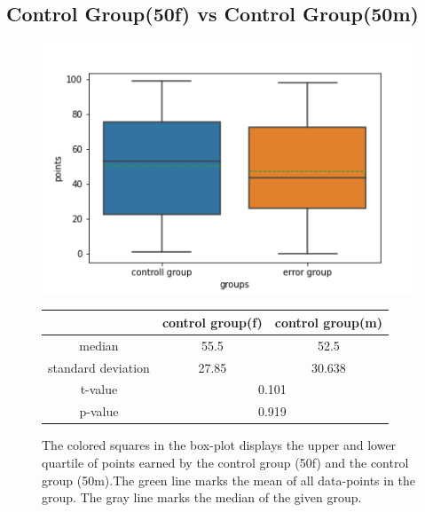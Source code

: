 \documentclass[runningheads]{llncs}
\begin{document}
\subsection{Control Group(50f) vs Control Group(50m)}
\begin{figure}
    \begin{minipage}{0.43\textwidth}        
        \includegraphics[width=\textwidth]{code/generate/all.png}
        \caption{The colored squares in the box-plot displays
        the upper and lower quartile of points earned by the control group (50f) and
        the control group (50m).The green line marks the mean of all data-points in the group.
        The gray line marks the median  of the given group.} \label{fig5}
    \end{minipage}
\hfill
\begin{minipage}{0.43\textwidth}
\begin{tabular}[]{| c | c | c |}
        \hline
        & control group(f) & control group(m) \\
        \hline
        median & 55.5&52.5 \\
        \hline
        standard deviation & 27.85&30.638 \\
        \hline
        t-value & \multicolumn{2}{c|}{0.101} \\
        \hline
        p-value & \multicolumn{2}{c|}{0.919} \\
        \hline            
\end{tabular}
\end{minipage}
\end{figure}
\clearpage
\end{document}
